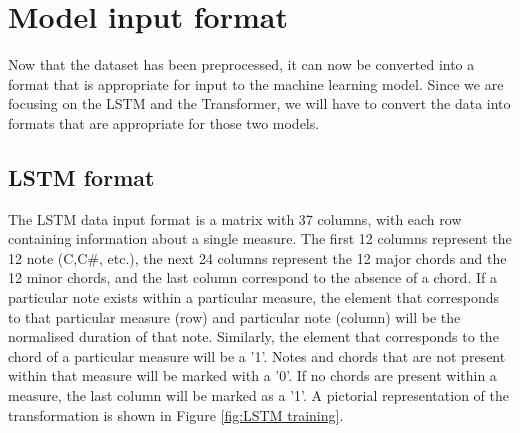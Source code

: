


\section{Model input format}
Now that the dataset has been preprocessed, it can now be converted into a format that is appropriate for input to the machine learning model. Since we are focusing on the LSTM and the Transformer, we will have to convert the data into formats that are appropriate for those two models.

\subsection{LSTM format}
\label{LSTM format for training}
The LSTM data input format is a matrix with 37 columns, with each row containing information about a single measure. The first 12 columns represent the 12 note (C,C\#, etc.), the next 24 columns represent the 12 major chords and the 12 minor chords, and the last column correspond to the absence of a chord. If a particular note exists within a particular measure, the element that corresponds to that particular measure (row) and particular note (column) will be the normalised duration of that note. Similarly, the element that corresponds to the chord of a particular measure will be a '1'. Notes and chords that are not present within that measure will be marked with a '0'. If no chords are present within a measure, the last column will be marked as a '1'. A pictorial representation of the transformation is shown in Figure \ref{fig:LSTM training}.

